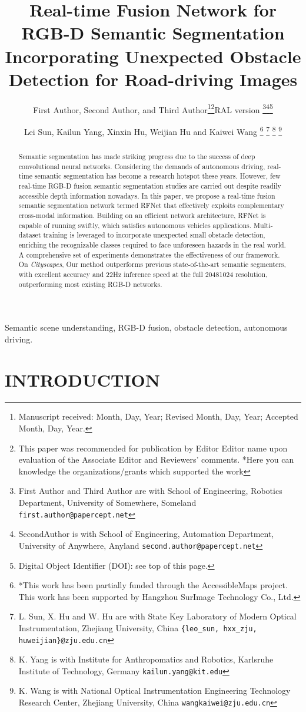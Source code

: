 \documentclass[letterpaper, 10 pt, journal, twoside]{ieeetran}
\author{First Author, Second Author, and Third Author\thanks{Manuscript received: Month, Day, Year; Revised Month, Day, Year;
Accepted Month, Day, Year.}\thanks{This paper was recommended for publication by Editor Editor name upon
evaluation of the Associate Editor and Reviewers' comments. *Here you can
knowledge the organizations/grants which supported the work}RAL version
\thanks{First Author and Third Author are with School of Engineering,
Robotics Department,
University of Somewhere, Someland
{\tt\small first.author@papercept.net}}\thanks{SecondAuthor is with School of Engineering, Automation
Department,
University of Anywhere, Anyland
{\tt\small second.author@papercept.net}}\thanks{Digital Object Identifier (DOI): see top of this page.}
}
\title{Real-time Fusion Network for RGB-D Semantic Segmentation Incorporating Unexpected Obstacle Detection for Road-driving Images}
\author{Lei Sun, Kailun Yang, Xinxin Hu, Weijian Hu and Kaiwei Wang
\thanks{*This work has been partially funded through the AccessibleMaps project. This work has been supported by Hangzhou SurImage Technology Co., Ltd.}
\thanks{L. Sun, X. Hu and W. Hu are with State Key Laboratory of Modern Optical Instrumentation, Zhejiang University, China {\tt \{leo\_sun, hxx\_zju, huweijian\}@zju.edu.cn}}
\thanks{K. Yang is with Institute for Anthropomatics and Robotics, Karlsruhe Institute of Technology, Germany {\tt kailun.yang@kit.edu}}
\thanks{K. Wang is with National Optical Instrumentation Engineering Technology Research Center, Zhejiang University, China {\tt wangkaiwei@zju.edu.cn}}
}
\begin{document}
\maketitle
\thispagestyle{empty}
\pagestyle{empty}


\begin{abstract}

Semantic segmentation has made striking progress due to the success of deep convolutional neural networks. Considering the demands of autonomous driving, real-time semantic segmentation has become a research hotspot these years. However, few real-time RGB-D fusion semantic segmentation studies are carried out despite readily accessible depth information nowadays.
In this paper, we propose a real-time fusion semantic segmentation network termed RFNet that effectively exploits complementary cross-modal information. Building on an efficient network architecture, RFNet is capable of running swiftly, which satisfies autonomous vehicles applications. Multi-dataset training is leveraged to incorporate unexpected small obstacle detection, enriching the recognizable classes required to face unforeseen hazards in the real world. A comprehensive set of experiments demonstrates the effectiveness of our framework. On \textit{Cityscapes}, Our method outperforms previous state-of-the-art semantic segmenters, with excellent accuracy and 22Hz inference speed at the full 20481024 resolution, outperforming most existing RGB-D networks.

\end{abstract}
\begin{IEEEkeywords}
    Semantic scene understanding, RGB-D fusion, obstacle detection, autonomous driving. 
\end{IEEEkeywords}

\section{INTRODUCTION}
\end{document}
